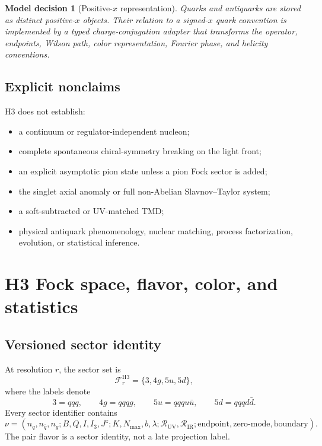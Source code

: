 \documentclass[11pt]{article}
\newtheorem{decision}[definition]{Model decision}
\newcommand{\cR}{\mathcal R}
\newcommand{\cF}{\mathcal F}
\newcommand{\UV}{\mathrm{UV}}
\newcommand{\IR}{\mathrm{IR}}
\newcommand{\Jz}{J^z}
\begin{document}
\begin{decision}[Positive-\(x\) representation]
Quarks and antiquarks are stored as distinct positive-\(x\) objects.  Their
relation to a signed-\(x\) quark convention is implemented by a typed
charge-conjugation adapter that transforms the operator, endpoints, Wilson
path, color representation, Fourier phase, and helicity conventions.
\end{decision}

\subsection{Explicit nonclaims}

H3 does not establish:
\begin{itemize}
 \item a continuum or regulator-independent nucleon;
 \item complete spontaneous chiral-symmetry breaking on the light front;
 \item an explicit asymptotic pion state unless a pion Fock sector is added;
 \item the singlet axial anomaly or full non-Abelian Slavnov--Taylor system;
 \item a soft-subtracted or UV-matched TMD;
 \item physical antiquark phenomenology, nuclear matching, process
       factorization, evolution, or statistical inference.
\end{itemize}

\section{H3 Fock space, flavor, color, and statistics}
\label{sec:fock}

\subsection{Versioned sector identity}

At resolution \(r\), the sector set is
\begin{equation}
 \cF_r^{\mathrm{H3}}
 =
 \{3,4g,5u,5d\},
\end{equation}
where the labels denote
\begin{equation}
 3=qqq,
 \qquad
 4g=qqqg,
 \qquad
 5u=qqqu\bar u,
 \qquad
 5d=qqqd\bar d.
\end{equation}
Every sector identifier contains
\begin{equation}
 \nu=
 \left(
 n_q,n_{\bar q},n_g;
 B,Q,I,I_3,\Jz;
 K,N_{\max},b,\lambda;
 \cR_{\UV},\cR_{\IR};
 \text{endpoint},\text{zero-mode},\text{boundary}
 \right).
\end{equation}
The pair flavor is a sector identity, not a late projection label.
\end{document}
